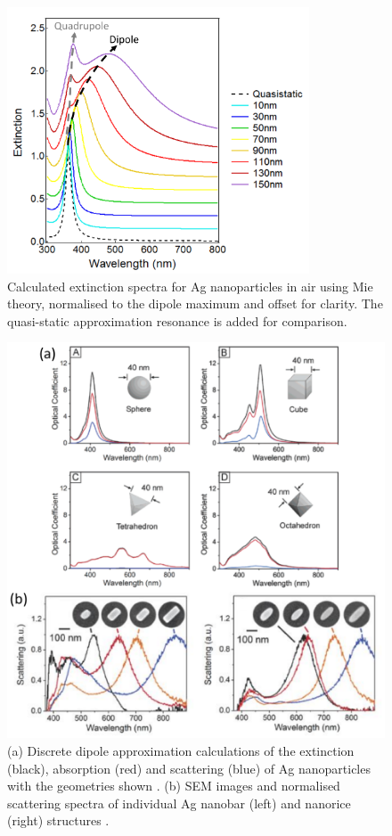 \begin{figure}[h!] 
\centering    
\includegraphics[width=0.8\textwidth]{Fig9}
\caption{Calculated extinction spectra for Ag nanoparticles in air using Mie theory, normalised to the dipole maximum and offset for clarity. The quasi-static approximation resonance is added for comparison.}
\label{3Fig9}
\end{figure}

\begin{figure}[h!] 
\centering    
\includegraphics[width=\textwidth]{Fig10}
\caption{(a) Discrete dipole approximation calculations of the extinction (black), absorption (red) and scattering (blue) of Ag nanoparticles with the geometries shown \cite{Wiley2006}. (b) SEM images and normalised scattering spectra of individual Ag nanobar (left) and nanorice (right) structures \cite{Wiley2007}.}
\label{3Fig10}
\end{figure}
